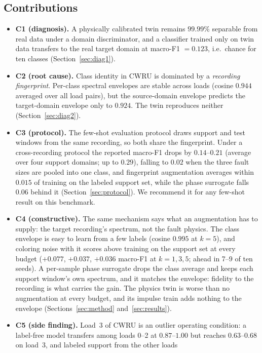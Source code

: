 \documentclass[preprint,12pt]{elsarticle}
\begin{document}
\subsection{Contributions}
\begin{itemize}
\item \textbf{C1 (diagnosis).} A physically calibrated twin remains
$99.99\%$ separable from real data under a domain discriminator, and a
classifier trained only on twin data transfers to the real target domain at
macro-F1 $=0.123$, i.e.\ chance for ten classes (Section~\ref{sec:diag1}).
\item \textbf{C2 (root cause).} Class identity in CWRU is dominated by a
\emph{recording fingerprint}. Per-class spectral envelopes are stable across
loads (cosine $0.944$ averaged over all load pairs), but the source-domain
envelope predicts the target-domain envelope only to $0.924$. The twin
reproduces neither (Section~\ref{sec:diag2}).
\item \textbf{C3 (protocol).} The few-shot evaluation protocol draws support
and test windows from the same recording, so both share the fingerprint. Under
a cross-recording protocol the reported macro-F1 drops by $0.14$--$0.21$
(average over four support domains; up to $0.29$), falling to $0.02$ when the
three fault sizes are pooled into one class, and fingerprint
augmentation averages within $0.015$ of training on the labeled support set,
while the phase surrogate falls $0.06$ behind it
(Section~\ref{sec:protocol}). We recommend it for any few-shot result on this
benchmark.
\item \textbf{C4 (constructive).} The same mechanism says what an augmentation
has to supply: the target recording's spectrum, not the fault physics. The
class envelope is easy to learn from a few labels (cosine $0.995$ at $k=5$),
and coloring noise with it scores above training on the support set at every
budget ($+0.077$, $+0.037$, $+0.036$ macro-F1 at $k=1,3,5$; ahead in 7--9 of
ten seeds).
A per-sample phase surrogate drops the class average and keeps each support
window's own spectrum, and it matches the envelope: fidelity to the recording
is what carries the gain. The physics twin is worse than no augmentation at
every budget, and its impulse train adds nothing to the envelope
(Sections~\ref{sec:method} and~\ref{sec:results}).
\item \textbf{C5 (side finding).} Load~3 of CWRU is an outlier operating
condition: a label-free model transfers among loads 0--2 at $0.87$--$1.00$ but
reaches $0.63$--$0.68$ on load~3, and labeled support from the other loads

\end{itemize}
\end{document}
